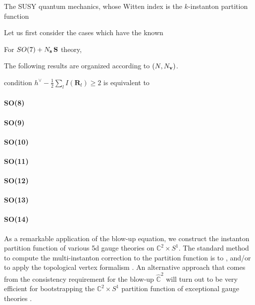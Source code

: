 \documentclass[letterpaper, 11pt]{article}
\begin{document}
{The SUSY quantum mechanics, whose Witten index is the $k$-instanton partition function 




Let us first consider the cases which have the known 


For $SO(7) + N_{\bf s}\,\mathbf{S}$ theory, 


The following results are organized according to $(N,N_{\bf v})$.




condition $h^\vee - \frac{1}{2}\sum_l I(\mathbf{R}_l) \geq 2$ is equivalent to 



\paragraph{SO(8)} 
\paragraph{SO(9)} 
\paragraph{SO(10)} 
\paragraph{SO(11)} 
\paragraph{SO(12)} 
\paragraph{SO(13)} 
\paragraph{SO(14)} 


  As a remarkable application of the blow-up equation, we construct the instanton partition function of various 5d gauge theories on $\mathbb{C}^2 \times S^1 $. The standard method to compute the multi-instanton correction to the partition function is to  , and/or to apply the topological vertex formalism . An alternative approach that comes from the consistency requirement for the blow-up $\hat{\mathbb{C}}^2$ will turn out to be very efficient for bootstrapping the $\mathbb{C}^2 \times S^1 $ partition function of exceptional gauge theories \cite{Keller:2012da, Huang:2017mis, Gu:2018gmy}.

}
\end{document}
